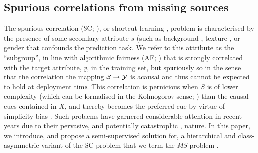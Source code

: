 \subsection{Spurious correlations from missing sources}\label{ssec:walkthrough}
The spurious correlation (\ac{SC}; \cite{arjovsky2019invariant}), or shortcut-learning
\citep{valle2018deep, geirhos2020shortcut}, problem is characterised by the presence of some
secondary attribute \(s\) (such as background \citep{beery2018recognition}, texture
\citep{geirhos2018imagenet}, or gender \citep{sagawa2019distributionally, seyyed2020chexclusion}
that confounds the prediction task.
%
We refer to this attribute as the ``subgroup'', in line with algorithmic fairness (\ac{AF};
\citet{barocas-hardt-narayanan}) that is strongly correlated with the target attribute, \(y\), in
the training set, but spuriously so in the sense that the correlation the mapping \( {\mathcal{S}} \to {\mathcal{Y}} \)
is acausal and thus cannot be expected to hold at deployment time. 
%
This correlation is pernicious when \(S\) is of lower complexity (which can be formalised in the
Kolmogorov sense; \citet{scimeca2021shortcut}) than the causal cues contained in \(X\), and thereby
becomes the preferred cue by virtue of simplicity bias \citep{valle2018deep}. 
%
Such problems have garnered considerable attention in recent years \citep{liu2021just,
pezeshki2021gradient, SohDunAngGuetal20, krueger2021out} due to their pervasive, and potentially
catastrophic \citep{codevilla2019exploring, de2019causal, castro2020causality}, nature.
%
In this paper, we introduce, and propose a semi-supervised solution for, a hierarchical and
class-asymmetric variant of the \ac{SC} problem that we term the \emph{\acf{MS}} problem .


